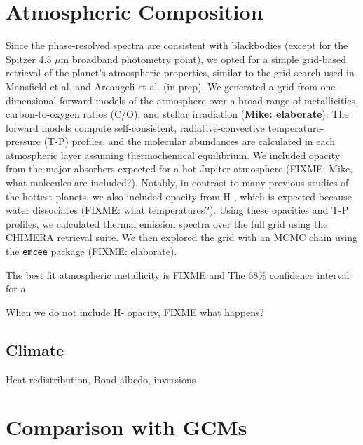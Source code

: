 \documentclass[twocolumn]{aastex61}
\begin{document}
\section{Atmospheric Composition}
Since the phase-resolved spectra are consistent with blackbodies (except for the Spitzer 4.5 $\mu$m broadband photometry point), we opted for a simple grid-based retrieval of the planet's atmospheric properties, similar to the grid search used in Mansfield et al. and Arcangeli et al. (in prep). We generated a grid from one-dimensional forward models of the atmosphere over a broad range of metallicities, carbon-to-oxygen ratios (C/O), and stellar irradiation (\textbf{Mike: elaborate}). The forward models compute self-consistent, radiative-convective temperature-pressure (T-P) profiles, and the molecular abundances are calculated in each atmospheric layer assuming thermochemical equilibrium.  We included opacity from the major absorbers expected for a hot Jupiter atmosphere (FIXME: Mike, what molecules are included?). Notably, in contrast to many previous studies of the hottest planets, we also included opacity from H-, which is expected because water dissociates (FIXME: what temperatures?).  Using these opacities and T-P profiles, we calculated thermal emission spectra over the full grid using the CHIMERA retrieval suite.  We then explored the grid with an MCMC chain using the \texttt{emcee} package \citep{foremanmackey13} (FIXME: elaborate).

The best fit atmospheric metallicity is FIXME and 
The 68\% confidence interval for a  


When we do not include H- opacity, FIXME what happens?

\subsection{Climate}
Heat redistribution, Bond albedo, inversions


\section{Comparison with GCMs}

\end{document}
